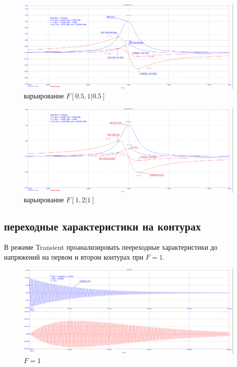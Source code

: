 \documentclass[a4paper, 14pt]{extarticle}%
\begin{document}
\begin{figure}[h!]
	\centering
			\includegraphics[width=1.1\linewidth]{908_work/9_1.png}
            \caption{варьирование $F [0.5, 1|0.5]$}
	\label{A}
\end{figure}


\begin{figure}[h!]
	\centering
			\includegraphics[width=1.1\linewidth]{908_work/9_2.png}
            \caption{варьирование $F [1, 2|1]$}
	\label{A}
\end{figure}


\subsection{переходные характеристики на контурах}

В режиме Transient проанализировать пеереходные характеристики до напряжений на первом и втором контурах при $ F  = 1$. 


\begin{figure}[h!]
	\centering
			\includegraphics[width=1.1\linewidth]{908_work/10_2.png}
            \caption{$F = 1$}
	\label{A}
\end{figure}
\end{document}
